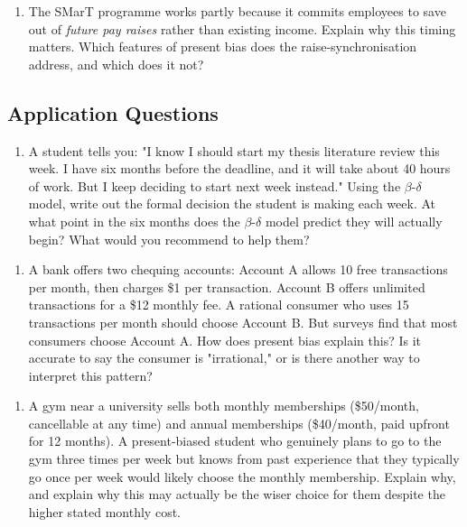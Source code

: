 \documentclass[12pt, letterpaper]{article}
\begin{document}
\begin{enumerate}
\item The SMarT programme works partly because it commits employees to save out of \textit{future pay raises} rather than existing income. Explain why this timing matters. Which features of present bias does the raise-synchronisation address, and which does it not?
\end{enumerate}


\subsection{Application Questions}


\begin{enumerate}
\item A student tells you: "I know I should start my thesis literature review this week. I have six months before the deadline, and it will take about 40 hours of work. But I keep deciding to start next week instead." Using the $\beta$-$\delta$ model, write out the formal decision the student is making each week. At what point in the six months does the $\beta$-$\delta$ model predict they will actually begin? What would you recommend to help them?
\end{enumerate}

\begin{enumerate}
\item A bank offers two chequing accounts: Account A allows 10 free transactions per month, then charges \$1 per transaction. Account B offers unlimited transactions for a \$12 monthly fee. A rational consumer who uses 15 transactions per month should choose Account B. But surveys find that most consumers choose Account A. How does present bias explain this? Is it accurate to say the consumer is "irrational," or is there another way to interpret this pattern?
\end{enumerate}

\begin{enumerate}
\item A gym near a university sells both monthly memberships (\$50/month, cancellable at any time) and annual memberships (\$40/month, paid upfront for 12 months). A present-biased student who genuinely plans to go to the gym three times per week but knows from past experience that they typically go once per week would likely choose the monthly membership. Explain why, and explain why this may actually be the wiser choice for them despite the higher stated monthly cost.
\end{enumerate}
\end{document}
